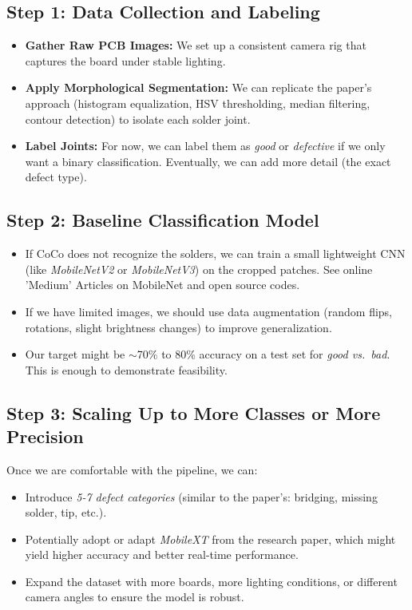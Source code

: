 \documentclass{article}
\begin{document}
\subsection{Step 1: Data Collection and Labeling}

\begin{itemize}
    \item \textbf{Gather Raw PCB Images:} We set up a consistent camera rig that captures the board under stable lighting.
    \item \textbf{Apply Morphological Segmentation:} We can replicate the paper’s approach 
          (histogram equalization, HSV thresholding, median filtering, contour detection) 
          to isolate each solder joint. 
    \item \textbf{Label Joints:} 
          For now, we can label them as \emph{good} or \emph{defective} if we only want a binary classification. 
          Eventually, we can add more detail (the exact defect type).
\end{itemize}

\subsection{Step 2: Baseline Classification Model}

\begin{itemize}
    \item If CoCo does not recognize the solders, we can train a small lightweight CNN (like \emph{MobileNetV2} or \emph{MobileNetV3}) on the cropped patches. See online 'Medium' Articles on MobileNet and open source codes.
    \item If we have limited images, we should use data augmentation (random flips, rotations, slight brightness changes) to improve generalization.
    \item Our target might be $\sim$70\% to 80\% accuracy on a test set for \emph{good vs.\ bad}. 
          This is enough to demonstrate feasibility.
\end{itemize}

\subsection{Step 3: Scaling Up to More Classes or More Precision}

Once we are comfortable with the pipeline, we can:

\begin{itemize}
    \item Introduce \emph{5-7 defect categories} (similar to the paper’s: bridging, missing solder, tip, etc.).
    \item Potentially adopt or adapt \emph{MobileXT} from the research paper, which might yield higher accuracy and better real-time performance. 
    \item Expand the dataset with more boards, more lighting conditions, or different camera angles to ensure the model is robust.
\end{itemize}
\end{document}
